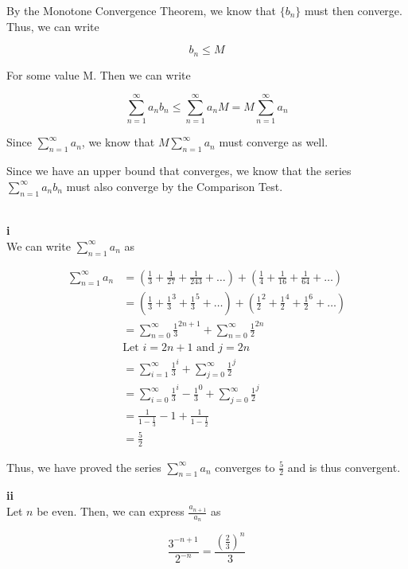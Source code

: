 \documentclass[addpoints]{exam}
\begin{document}
\begin{questions}
By the Monotone Convergence Theorem, we know that $\{b_n\}$ must then converge. Thus, we can write

\[b_n \leq M\]

For some value M. Then we can write 

\[\sum_{n = 1}^{\infty} a_n b_n \leq \sum_{n = 1}^{\infty} a_n M = M \sum_{n = 1}^{\infty} a_n\]

Since $\sum_{n = 1}^{\infty} a_n$, we know that $M \sum_{n = 1}^{\infty} a_n$ must converge as well. 

Since we have an upper bound that converges, we know that the series $\sum_{n = 1}^{\infty} a_n b_n$ must also converge by the 
Comparison Test.

\question \\

\textbf{i} \\

We can write $\sum_{n = 1}^{\infty} a_n$ as 

\begin{align*}
    \sum_{n = 1}^{\infty} a_n &= \left(\frac{1}{3} + \frac{1}{27} + \frac{1}{243} + \dots \right) + \left(\frac{1}{4} + \frac{1}{16} + \frac{1}{64} + \dots \right) \\
    &= \left(\frac{1}{3} + \frac{1}{3}^3 + \frac{1}{3}^5 + \dots \right) + \left(\frac{1}{2}^2 + \frac{1}{2}^4 + \frac{1}{2}^6 + \dots \right) \\
    &= \sum_{n = 0}^{\infty} \frac{1}{3}^{2n+1} + \sum_{n = 0}^{\infty} \frac{1}{2}^{2n} \\
    &\text{Let $i = 2n+1$ and $j = 2n$} \\ 
    &= \sum_{i = 1}^{\infty} \frac{1}{3}^i + \sum_{j = 0}^{\infty} \frac{1}{2}^j \\
    &= \sum_{i = 0}^{\infty} \frac{1}{3}^i - \frac{1}{3}^0 + \sum_{j = 0}^{\infty} \frac{1}{2}^j \\
    &= \frac{1}{1 - \frac{1}{3}} - 1 + \frac{1}{1 - \frac{1}{2}} \\
    &= \frac{5}{2}
\end{align*}

Thus, we have proved the series $\sum_{n = 1}^{\infty} a_n$ converges to $\frac{5}{2}$ and is thus convergent. 

\textbf{ii} \\

Let $n$ be even. Then, we can express $\frac{a_{n+1}}{a_n}$ as 

\[\frac{3^{-n + 1}}{2^{-n}} = \frac{(\frac{2}{3})^n}{3}\]


\end{questions}
\end{document}
